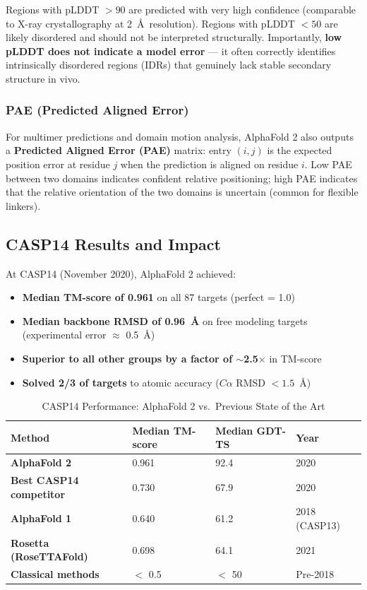 ﻿\documentclass[12pt,a4paper]{article}
\begin{document}
Regions with pLDDT $> 90$ are predicted with very high confidence (comparable to X-ray crystallography at 2~\AA\ resolution). Regions with pLDDT $< 50$ are likely disordered and should not be interpreted structurally. Importantly, \textbf{low pLDDT does not indicate a model error} --- it often correctly identifies intrinsically disordered regions (IDRs) that genuinely lack stable secondary structure in vivo.

\subsubsection{PAE (Predicted Aligned Error)}

For multimer predictions and domain motion analysis, AlphaFold 2 also outputs a \textbf{Predicted Aligned Error (PAE)} matrix: entry $(i,j)$ is the expected position error at residue $j$ when the prediction is aligned on residue $i$. Low PAE between two domains indicates confident relative positioning; high PAE indicates that the relative orientation of the two domains is uncertain (common for flexible linkers).

\subsection{CASP14 Results and Impact}

At CASP14 (November 2020), AlphaFold 2 achieved:
\begin{itemize}[leftmargin=*, itemsep=4pt]
  \item \textbf{Median TM-score of 0.961} on all 87 targets (perfect = 1.0)
  \item \textbf{Median backbone RMSD of 0.96~\AA} on free modeling targets (experimental error $\approx$ 0.5~\AA)
  \item \textbf{Superior to all other groups by a factor of $\sim$2.5$\times$} in TM-score
  \item \textbf{Solved 2/3 of targets} to atomic accuracy ($C\alpha$ RMSD $< 1.5$~\AA)
\end{itemize}

\begin{table}[H]
\centering
\caption{CASP14 Performance: AlphaFold 2 vs.\ Previous State of the Art}
\begin{tabularx}{\textwidth}{>{\bfseries}lXXX}
\toprule
\rowcolor{primaryblue}
\color{white}\textbf{Method} & \color{white}\textbf{Median TM-score} & \color{white}\textbf{Median GDT-TS} & \color{white}\textbf{Year} \\
\midrule
\rowcolor{successgreen!20}
AlphaFold 2 & 0.961 & 92.4 & 2020 \\
\addlinespace
\rowcolor{lightblue!40}
Best CASP14 competitor & 0.730 & 67.9 & 2020 \\
\addlinespace
AlphaFold 1 & 0.640 & 61.2 & 2018 (CASP13) \\
\addlinespace
\rowcolor{lightblue!40}
Rosetta (RoseTTAFold) & 0.698 & 64.1 & 2021 \\
\addlinespace
Classical methods & $<$ 0.5 & $<$ 50 & Pre-2018 \\
\bottomrule
\end{tabularx}
\end{table}
\end{document}
